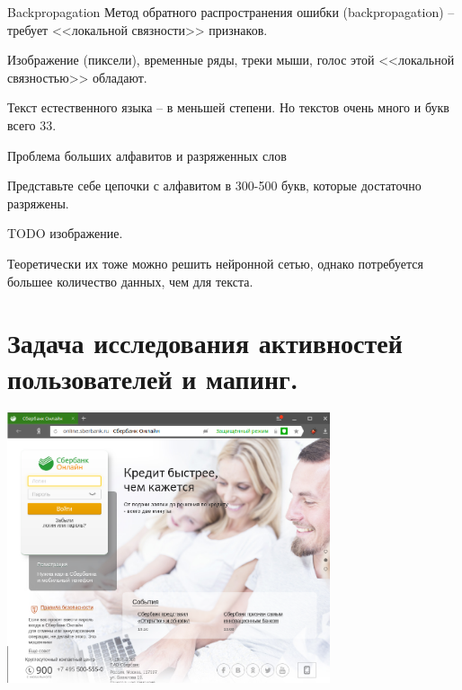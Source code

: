 \begin{frame}{Backpropagation}
	Метод обратного распространения ошибки (backpropagation) 
	-- требует <<локальной связности>> признаков. 
	
	Изображение (пиксели), временные ряды, треки мыши, голос этой <<локальной связностью>>
	обладают.
	
	Текст естественного языка -- в меньшей степени. Но текстов очень много и букв всего 33.
\end{frame}

\begin{frame}{Проблема больших алфавитов и разряженных слов}
	
	Представьте себе цепочки с алфавитом в 300-500 букв,
	которые достаточно разряжены.
	
	TODO изображение.
	
	Теоретически их тоже можно решить нейронной сетью,
	однако потребуется большее количество данных, чем для текста.
\end{frame}


\section{Задача исследования активностей пользователей и мапинг.}\label{section:text_tasks}

\begin{frame}
		
	\begin{center}
		\includegraphics[width=9.5cm]{../pic/sber_logo_1.png}\centering
	\end{center}

\end{frame}


